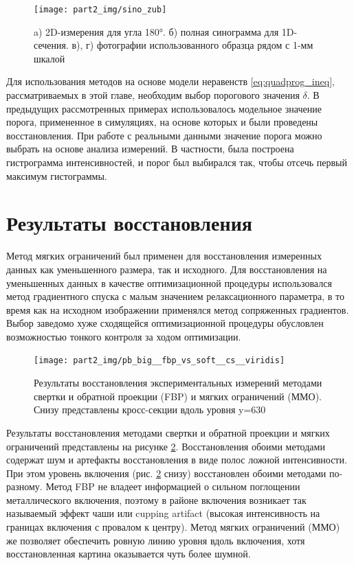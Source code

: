 \begin{figure}
    \centering
    \texttt{[image: part2\_img/sino\_zub]} \\
    \caption{a) 2D-измерения для угла \ang{180}. б) полная синограмма для 1D-сечения. в), г) фотографии использованного образца рядом с 1-мм шкалой}
    \label{fig:sino_zub}
\end{figure}

Для использования методов на основе модели неравенств \ref{eq:quadprog_ineq}, рассматриваемых в этой главе, необходим выбор порогового значения $\delta$.
В предыдущих рассмотренных примерах использовалось модельное значение порога, примененное в симуляциях, на основе которых и были проведены восстановления.
При работе с реальными данными значение порога можно выбрать на основе анализа измерений.
В частности, была построена гистрограмма интенсивностей, и порог был выбирался так, чтобы отсечь первый максимум гистограммы.


\section{Результаты восстановления}
Метод мягких ограничений был применен для восстановления измеренных данных как уменьшенного размера, так и исходного.
Для восстановления на уменьшенных данных в качестве оптимизационной процедуры использовался метод градиентного спуска с малым значением релаксационного параметра, в то время как на исходном изображении применялся метод сопряженных градиентов. 
Выбор заведомо хуже сходящейся оптимизационной процедуры обусловлен возможностью тонкого контроля за ходом оптимизации.

\begin{figure}
    \centering
    \texttt{[image: part2\_img/pb\_big\_\_fbp\_vs\_soft\_\_cs\_\_viridis]} \\
    \caption{Результаты восстановления экспериментальных измерений методами свертки и обратной проекции (FBP) и мягких ограничений (ММО). Снизу представлены кросс-секции вдоль уровня y=630}
    \label{fig:fbp_vs_soft__zub}
\end{figure}

Результаты восстановления методами свертки и обратной проекции и мягких ограничений представлены на рисунке \ref{fig:fbp_vs_soft__zub}.
Восстановления обоими методами содержат шум и артефакты восстановления в виде полос ложной интенсивности.
При этом уровень включения (рис. \ref{fig:fbp_vs_soft__zub} снизу) восстановлен обоими методами по-разному.
Метод FBP не владеет информацией о сильном поглощении металлического включения, поэтому в районе включения возникает так называемый эффект чаши или cupping artifact (высокая интенсивность на границах включения с провалом к центру).
Метод мягких ограничений (ММО) же позволяет обеспечить ровную линию уровня вдоль включения, хотя восстановленная картина оказывается чуть более шумной.

